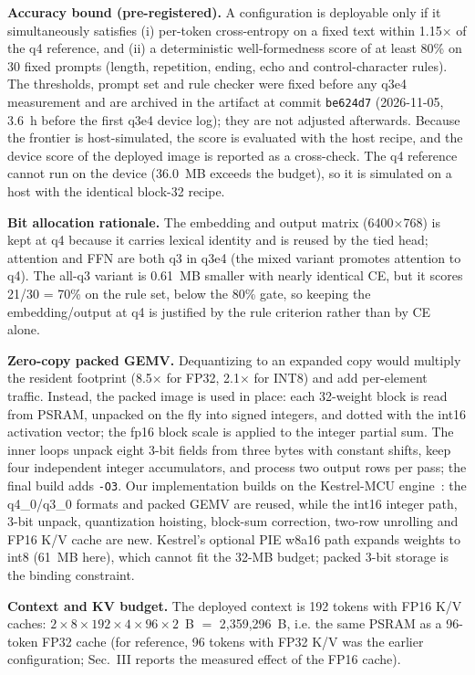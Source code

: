 \documentclass[journal,letterpaper]{IEEEtran}
\begin{document}
\textbf{Accuracy bound (pre-registered).} A configuration is deployable only if it
simultaneously satisfies (i) per-token cross-entropy on a fixed text within 1.15$\times$ of the
q4 reference, and (ii) a deterministic well-formedness score of at least 80\% on 30 fixed
prompts (length, repetition, ending, echo and control-character rules). The thresholds, prompt
set and rule checker were fixed before any q3e4 measurement and are archived in the artifact at
commit \texttt{be624d7} (2026-11-05, 3.6~h before the first q3e4 device log); they are not
adjusted afterwards. Because the frontier is host-simulated, the score is evaluated with the
host recipe, and the device score of the deployed image is reported as a cross-check. The q4
reference cannot run on the device (36.0~MB exceeds the budget), so it is simulated on a host
with the identical block-32 recipe.

\textbf{Bit allocation rationale.} The embedding and output matrix (6400$\times$768) is kept at
q4 because it carries lexical identity and is reused by the tied head; attention and FFN are both
q3 in q3e4 (the mixed variant promotes attention to q4). The all-q3 variant is 0.61~MB smaller
with nearly identical CE, but it scores 21/30 = 70\% on the rule set, below the 80\% gate, so
keeping the embedding/output at q4 is justified by the rule criterion rather than by CE alone.

\textbf{Zero-copy packed GEMV.} Dequantizing to an expanded copy would multiply the resident
footprint (8.5$\times$ for FP32, 2.1$\times$ for INT8) and add per-element traffic. Instead, the
packed image is used in place: each 32-weight block is read from PSRAM, unpacked on the fly into
signed integers, and dotted with the int16 activation vector; the fp16 block scale is applied to
the integer partial sum. The inner loops unpack eight 3-bit fields from three bytes with constant
shifts, keep four independent integer accumulators, and process two output rows per pass; the
final build adds \texttt{-O3}. Our implementation builds on the Kestrel-MCU engine~\cite{kestrel}:
the q4\_0/q3\_0 formats and packed GEMV are reused, while the int16 integer path, 3-bit unpack,
quantization hoisting, block-sum correction, two-row unrolling and FP16 K/V cache are new.
Kestrel's optional PIE w8a16 path expands weights to int8 (61~MB here), which cannot fit the
32-MB budget; packed 3-bit storage is the binding constraint.

\textbf{Context and KV budget.} The deployed context is 192 tokens with FP16 K/V caches:
$2 \times 8 \times 192 \times 4 \times 96 \times 2$~B $=$ 2,359,296~B, i.e. the same PSRAM as a
96-token FP32 cache (for reference, 96 tokens with FP32 K/V was the earlier configuration;
Sec.~III reports the measured effect of the FP16 cache).
\end{document}
